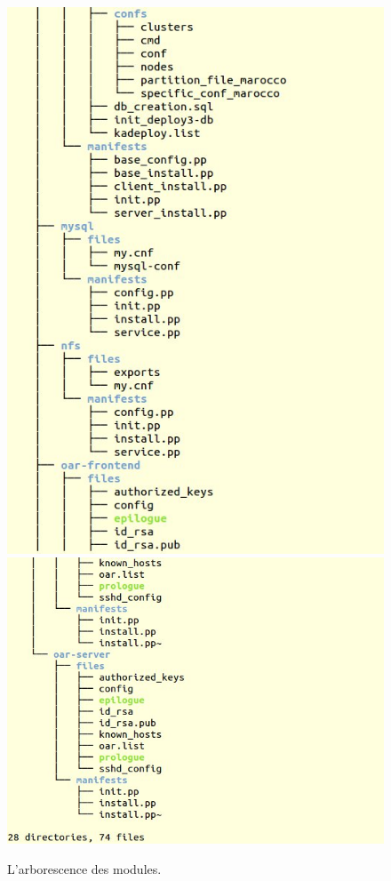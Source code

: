 \documentclass[a4paper,10pt]{article}
\begin{document}
\begin{figure}[!h]
			\includegraphics[scale=0.397]{Tree2.jpg}
			\label{Arborescence}
			\centering			
			\includegraphics[scale=0.365]{Tree3.jpg}
			\caption{L'arborescence des modules.}	
			\label{Arbo2}
		\end{figure}
\newpage
\end{document}
